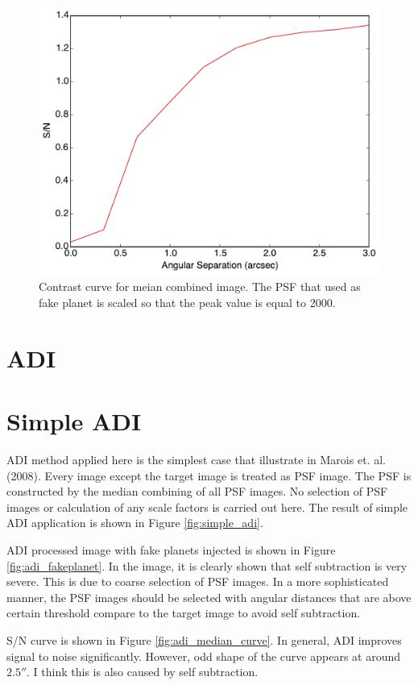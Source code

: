 \documentclass[paper=letter, fontsize=11pt]{scrartcl} %
\numberwithin{equation}{section} %
\numberwithin{figure}{section} %
\numberwithin{table}{section} %
\begin{document}
 \begin{figure}
   \centering
   \includegraphics[width=\textwidth]{median_contrastCurve_amp=2000}
   \caption{Contrast curve for meian combined image. The PSF that used
     as fake planet is scaled so that the peak value is equal to
     2000. }
   \label{fig:median_curve}
 \end{figure}
 
 \section{ADI}
 \section{Simple ADI}
 ADI method applied here is the simplest case that illustrate in
 Marois et. al. (2008). Every image except the target image is treated
 as PSF image. The PSF is constructed by the median combining of all
 PSF images. No selection of PSF images or calculation of any scale
 factors is carried out here. The result of simple ADI application is
 shown in Figure \ref{fig:simple_adi}.

ADI processed image with fake planets injected is shown in Figure
\ref{fig:adi_fakeplanet}. In the image, it is clearly shown that self
subtraction is very severe. This is due to coarse selection of PSF
images. In a more sophisticated manner, the PSF images should be
selected with angular distances that are above certain threshold
compare to the target image to avoid self subtraction.

S/N curve is shown in Figure \ref{fig:adi_median_curve}. In general,
ADI improves  signal to noise significantly. However, odd shape of the
curve appears at around $2.5''$. I think this is also caused by self
subtraction.
\end{document}
